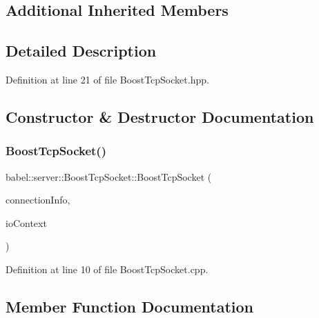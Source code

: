 \subsection*{Additional Inherited Members}


\subsection{Detailed Description}


Definition at line 21 of file Boost\+Tcp\+Socket.\+hpp.



\subsection{Constructor \& Destructor Documentation}
\mbox{\label{classbabel_1_1server_1_1_boost_tcp_socket_a2f3dff111d960e94b72d00f7da25cb05}} 
\subsubsection{\texorpdfstring{Boost\+Tcp\+Socket()}{BoostTcpSocket()}}
{\footnotesize\ttfamily babel\+::server\+::\+Boost\+Tcp\+Socket\+::\+Boost\+Tcp\+Socket (\begin{DoxyParamCaption}\item[{\mbox{\hyperlink{classbabel_1_1common_1_1_connection_info}{common\+::\+Connection\+Info}}}]{connection\+Info,  }\item[{boost\+::asio\+::io\+\_\+context \&}]{io\+Context }\end{DoxyParamCaption})}



Definition at line 10 of file Boost\+Tcp\+Socket.\+cpp.



\subsection{Member Function Documentation}
\mbox{\label{classbabel_1_1server_1_1_boost_tcp_socket_aaf7b9b56a3587d8b48c5ed9418492e12}} 
